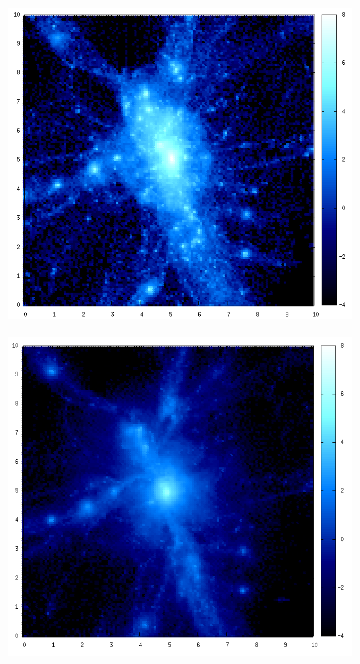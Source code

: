 \documentclass[journal]{IEEEtran}
\begin{document}
\begin{figure}[htb]\ContinuedFloat
	\centering
	\begin{subfigure}[t]{0.25\textwidth}
		\centering
		\includegraphics[width=\linewidth]{DM05-06.png}
	\end{subfigure}
	\quad
	\begin{subfigure}[t]{0.25\textwidth}
		\centering
		\includegraphics[width=\linewidth]{GAS05-06.png}

\end{subfigure}
\end{figure}
\end{document}
